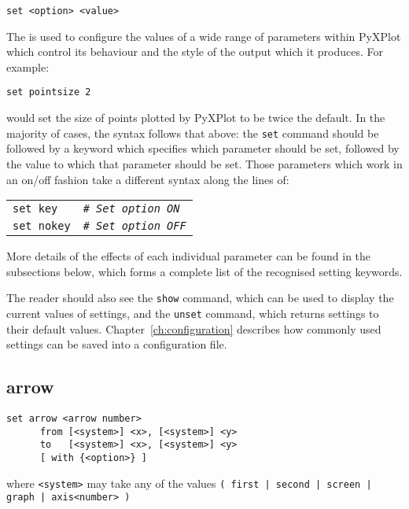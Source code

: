\begin{verbatim}
set <option> <value>
\end{verbatim}

The  is used to configure the values of a wide range of parameters
within PyXPlot which control its behaviour and the style of the output which it
produces.  For example:

\begin{verbatim}
set pointsize 2
\end{verbatim}

\noindent would set the size of points plotted by PyXPlot to be twice the
default. In the majority of cases, the syntax follows that above: the {\tt set}
command should be followed by a keyword which specifies which parameter
should be set, followed by the value to which that parameter should be
set. Those parameters which work in an on/off fashion take a different syntax
along the lines of:

\vspace{3mm}
\begin{tabular}{ll}
{\tt set key} & {\tt\it \# Set option ON} \\
{\tt set nokey} & {\tt\it \# Set option OFF}
\end{tabular}
\vspace{3mm}

\noindent
More details of the effects of each individual parameter can be found in the
subsections below, which forms a complete list of the recognised setting
keywords.

The reader should also see the {\tt show} command, which can be used to display
the current values of settings, and the {\tt unset} command, which returns
settings to their default values. Chapter~\ref{ch:configuration} describes how
commonly used settings can be saved into a configuration file.


\subsection{arrow}

\begin{verbatim}
set arrow <arrow number>
      from [<system>] <x>, [<system>] <y>
      to   [<system>] <x>, [<system>] <y>
      [ with {<option>} ]
\end{verbatim}

\noindent where {\tt <system>} may take any of the values
\newline\noindent
{\tt ( first | second | screen | graph | axis<number> )}
\vspace{5mm}

